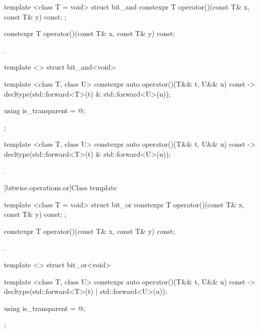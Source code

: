 %
\begin{itemdecl}
template <class T = void> struct bit_and {
  constexpr T operator()(const T& x, const T& y) const;
};
\end{itemdecl}

%
\begin{itemdecl}
constexpr T operator()(const T& x, const T& y) const;
\end{itemdecl}

\begin{itemdescr}
\pnum\returns {}.
\end{itemdescr}

%
\begin{itemdecl}
template <> struct bit_and<void> {
  template <class T, class U> constexpr auto operator()(T&& t, U&& u) const
    -> decltype(std::forward<T>(t) & std::forward<U>(u));

  using is_transparent = @\unspec@;
};
\end{itemdecl}

%
\begin{itemdecl}
template <class T, class U> constexpr auto operator()(T&& t, U&& u) const
    -> decltype(std::forward<T>(t) & std::forward<U>(u));
\end{itemdecl}

\begin{itemdescr}
\pnum\returns {}.
\end{itemdescr}

[bitwise.operations.or]{Class template }

%
\begin{itemdecl}
template <class T = void> struct bit_or {
  constexpr T operator()(const T& x, const T& y) const;
};
\end{itemdecl}

%
\begin{itemdecl}
constexpr T operator()(const T& x, const T& y) const;
\end{itemdecl}

\begin{itemdescr}
\pnum\returns {}.
\end{itemdescr}

%
\begin{itemdecl}
template <> struct bit_or<void> {
  template <class T, class U> constexpr auto operator()(T&& t, U&& u) const
    -> decltype(std::forward<T>(t) | std::forward<U>(u));

  using is_transparent = @\unspec@;
};
\end{itemdecl}

